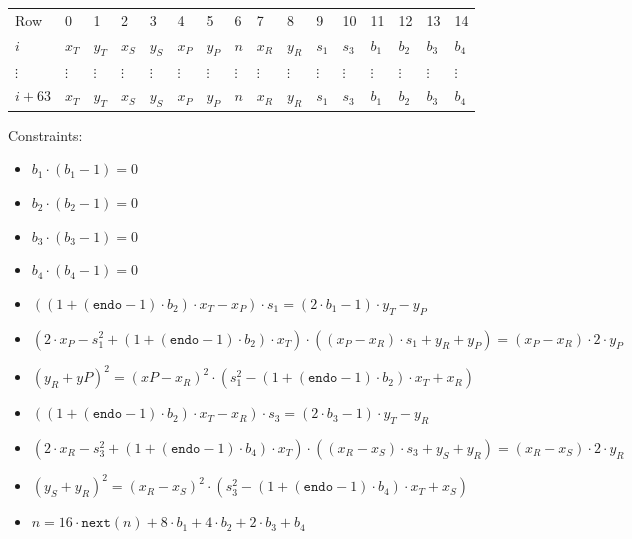 \begin{center}
    \begin{table}[H]
        \begin{tabular}{llllllllllllllll}
            Row    & 0        & 1        & 2        & 3        & 4        & 5        & 6        & 7        & 8        & 9        & 10       & 11       & 12       & 13       & 14       \\
            $i$   & $x_T$    & $y_T$    & $x_S$    & $y_S$    & $x_P$    & $y_P$    & $n$      & $x_R$    & $y_R$    & $s_1$    & $s_3$    & $b_1$    & $b_2$ & $b_3$ & $b_4$ \\
            $\vdots$ & $\vdots$ & $\vdots$ & $\vdots$ & $\vdots$ & $\vdots$ & $\vdots$ & $\vdots$ & $\vdots$ & $\vdots$ & $\vdots$ & $\vdots$ & $\vdots$ & $\vdots$ & $\vdots$ & $\vdots$ \\
            $i + 63$ &  $x_T$    & $y_T$    & $x_S$    & $y_S$    & $x_P$    & $y_P$    & $n$      & $x_R$    & $y_R$    & $s_1$    & $s_3$    & $b_1$    & $b_2$ & $b_3$ & $b_4$ \\
        \end{tabular}
    \end{table}
\end{center}

Constraints:
\begin{itemize}
    \item $b_1 \cdot (b_1 - 1) = 0$
    \item $b_2 \cdot (b_2 - 1) = 0$
    \item $b_3 \cdot (b_3 - 1) = 0$
    \item $b_4 \cdot (b_4 - 1) = 0$
    \item $((1 + (\texttt{endo} - 1) \cdot b_2) \cdot x_T - x_P) \cdot s_1 = (2 \cdot b_1 - 1) \cdot y_T - y_P$
    \item $(2 \cdot x_P - s_1^2 + (1 + (\texttt{endo} - 1) \cdot b_2) \cdot x_T) \cdot ((x_P - x_R) \cdot s_1 + y_R + y_P) = (x_P - x_R) \cdot 2 \cdot y_P$
    \item $(y_R + yP)^2 = (xP - x_R)^2 \cdot (s_1^2 - (1 + (\texttt{endo} - 1) \cdot b_2) \cdot x_T + x_R)$
    \item $((1 + (\texttt{endo} - 1) \cdot b_2) \cdot x_T - x_R) \cdot s_3 = (2 \cdot b_3-1) \cdot y_T - y_R$
    \item $(2 \cdot x_R - s_3^2 + (1 + (\texttt{endo} - 1) \cdot b_4) \cdot x_T) \cdot ((x_R - x_S) \cdot s_3 + y_S + y_R) = (x_R - x_S) \cdot 2 \cdot y_R$
    \item $(y_S + y_R)^2 = (x_R - x_S)^2 \cdot (s_3^2 - (1 + (\texttt{endo} - 1) \cdot b_4) \cdot x_T + x_S)$
    \item $n = 16 \cdot \texttt{next}(n) + 8 \cdot b_1 + 4 \cdot b_2 + 2 \cdot b_3 + b_4$
\end{itemize}

